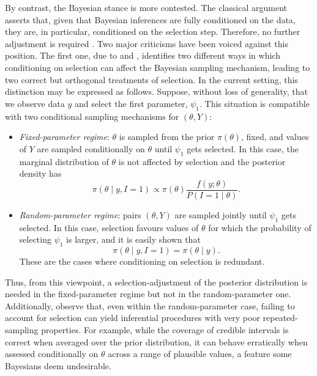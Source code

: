 \documentclass[pdflatex,sn-chicago]{sn-jnl}%
\theoremstyle{thmstyleone}%
\theoremstyle{thmstyletwo}%
\theoremstyle{thmstylethree}%
\begin{document}
By contrast, the Bayesian stance is more contested. The classical argument asserts that, given that Bayesian inferences are fully conditioned on the data, they are, in particular, conditioned on the selection step. Therefore, no further adjustment is required \citep{dawid}. Two major criticisms have been voiced against this position. The first one, due to \cite{MR1, MR2} and \cite{yekutieli}, identifies two different ways in which conditioning on selection can affect the Bayesian sampling mechanism, leading to two correct but orthogonal treatments of selection. In the current setting, this distinction may be expressed as follows. Suppose, without loss of generality, that we observe data $y$ and select the first parameter, $\psi_1$. This situation is compatible with two conditional sampling mechanisms for $(\theta, Y)$:
\begin{itemize}
    \item \textit{Fixed-parameter regime}: $\theta$ is sampled from the prior $\pi(\theta)$, fixed, and values of $Y$ are sampled conditionally on $\theta$ until $\psi_1$ gets selected. In this case, the marginal distribution of $\theta$ is not affected by selection and the posterior density has
    \begin{equation*}
        \pi(\theta\mid y, I = 1) \propto \pi(\theta) \frac{ f(y; \theta)}{P(I = 1 \mid \theta)}.
    \end{equation*}
    \item \textit{Random-parameter regime}: pairs $(\theta, Y)$ are sampled jointly until $\psi_1$ gets selected. In this case, selection favours values of $\theta$ for which the probability of selecting $\psi_1$ is larger, and it is easily shown that
    \begin{equation*}
        \pi(\theta\mid y, I = 1) = \pi(\theta\mid y).
    \end{equation*}
    These are the cases where conditioning on selection is redundant.
\end{itemize}
Thus, from this viewpoint, a selection-adjustment of the posterior distribution is needed in the fixed-parameter regime but not in the random-parameter one. Additionally, \cite{handbook_open} observe that, even within the random-parameter case, failing to account for selection can yield inferential procedures with very poor repeated-sampling properties. For example, while the coverage of credible intervals is correct when averaged over the prior distribution, it can behave erratically when assessed conditionally on $\theta$ across a range of plausible values, a feature some Bayesians deem undesirable.
\end{document}
